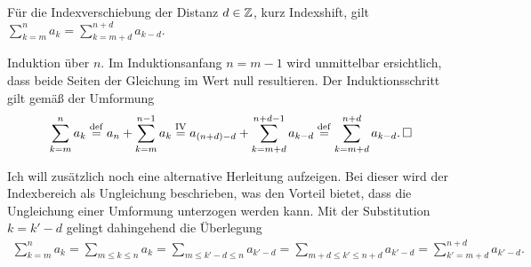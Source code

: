 \begin{Satz}[Indexverschiebung]%
\label{Summe-Indexshift}\newlinefirst
Für die Indexverschiebung der Distanz $d\in\mathbb Z$,
kurz Indexshift, gilt\\
$\sum_{k=m}^n a_k = \sum_{k=m+d}^{n+d} a_{k-d}.$
\end{Satz}
\begin{Beweis}
Induktion über $n$. Im Induktionsanfang $n=m-1$ wird unmittelbar
ersichtlich, dass beide Seiten der Gleichung im Wert null resultieren.
Der Induktionsschritt gilt gemäß der Umformung%
\begin{align*}
\sum_{k=m}^n a_k \stackrel{\mathrm{def}}= a_n+\sum_{k=m}^{n-1} a_k
\stackrel{\mathrm{IV}}= a_{(n+d)-d}+\sum_{k=m+d}^{n+d-1} a_{k-d}
\stackrel{\mathrm{def}}= \sum_{k=m+d}^{n+d} a_{k-d}.\,\Box
\end{align*}
\end{Beweis}

\noindent
Ich will zusätzlich noch eine alternative Herleitung aufzeigen. Bei
dieser wird der Indexbereich als Ungleichung beschrieben, was den
Vorteil bietet, dass die Ungleichung einer Umformung unterzogen werden
kann. Mit der Substitution $k=k'-d$ gelingt dahingehend die Überlegung%
\begin{align*}
\sum_{k=m}^n a_k = \sum_{m\le k\le n} a_k
= \!\!\sum_{m\le k'-d\le n}\!\! a_{k'-d}
= \!\!\sum_{m+d\le k'\le n+d}\!\! a_{k'-d}
= \sum_{k'=m+d}^{n+d} a_{k'-d}.
\end{align*}

